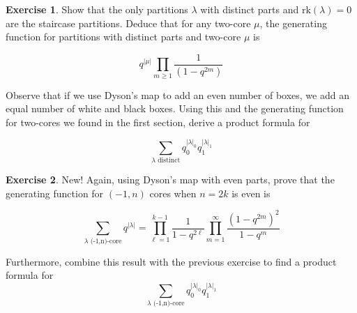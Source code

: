 \documentclass{article}
\theoremstyle{definition}
\newtheorem{exercise}{Exercise}
\begin{document}
\begin{exercise}
Show that the only partitions $\lambda$ with distinct parts and $\textrm{rk}(\lambda)=0$ are the staircase partitions.  Deduce that for any two-core $\mu$, the generating function for partitions with distinct parts and two-core $\mu$ is

$$q^{|\mu|}\prod_{m\geq 1}\frac{1}{(1-q^{2m})}$$
\end{exercise}


Observe that if we use Dyson's map to add an even number of boxes, we add an equal number of white and black boxes.  Using this and the generating function for two-cores we found in the first section, derive a product formula for

$$\sum_{\lambda \textrm{ distinct}} q_0^{|\lambda|_0}q_1^{|\lambda|_1}$$

\begin{exercise} {\color{red} New!} Again, using Dyson's map with even parts, prove that the generating function for $(-1,n)$ cores when $n=2k$ is even is

$$\sum_{\lambda \text{ (-1,n)-core}}q^{|\lambda|} =\prod_{\ell=1}^{k-1}\frac{1}{1-q^{2\ell}} \prod_{m=1}^\infty \frac{(1-q^{2m})^2}{1-q^m}$$ 

Furthermore, combine this result with the previous exercise to find a product formula for
$$\sum_{\lambda \text{ (-1,n)-core}}q_0^{|\lambda|_0}q_1^{|\lambda|_1}$$
\end{exercise}
\end{document}
